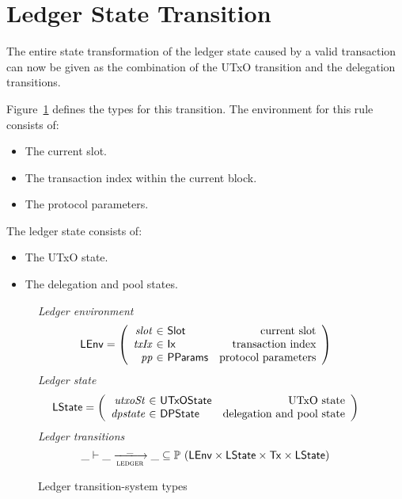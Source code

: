 \section{Ledger State Transition}
\label{sec:ledger-trans}

The entire state transformation of the ledger state caused by a valid transaction
can now be given as the combination of the UTxO transition and the delegation transitions.

Figure~\ref{fig:ts-types:ledger} defines the types for this transition.
The environment for this rule consists of:
\begin{itemize}
  \item The current slot.
  \item The transaction index within the current block.
  \item The protocol parameters.
\end{itemize}
The ledger state consists of:
\begin{itemize}
  \item The UTxO state.
  \item The delegation and pool states.
\end{itemize}

\begin{figure}[htb]
  \emph{Ledger environment}
  \begin{equation*}
    \LEnv =
    \left(
      \begin{array}{r@{~\in~}lr}
        \var{slot} & \Slot & \text{current slot}\\
        \var{txIx} & \Ix & \text{transaction index}\\
        \var{pp} & \PParams & \text{protocol parameters}\\
      \end{array}
    \right)
  \end{equation*}
  \emph{Ledger state}
  \begin{equation*}
    \LState =
    \left(
      \begin{array}{r@{~\in~}lr}
        \var{utxoSt} & \UTxOState & \text{UTxO state}\\
        \var{dpstate} & \DPState & \text{delegation and pool state}\\
      \end{array}
    \right)
  \end{equation*}
  \emph{Ledger transitions}
  \begin{equation*}
    \_ \vdash
    \var{\_} \trans{ledger}{\_} \var{\_}
    \subseteq \powerset (\LEnv \times \LState \times \Tx \times \LState)
  \end{equation*}
  \caption{Ledger transition-system types}
  \label{fig:ts-types:ledger}
\end{figure}

